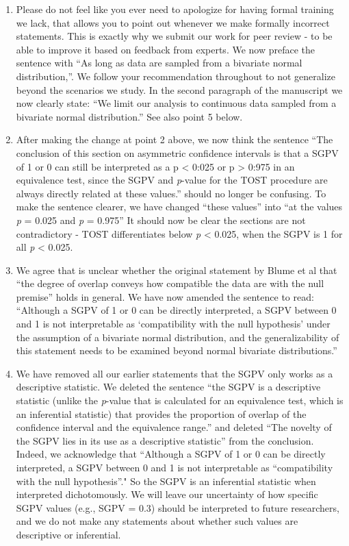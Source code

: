 \documentclass[man]{apa6}
\begin{document}
\begin{enumerate}
\item
  Please do not feel like you ever need to apologize for having formal training we lack, that allows you to point out whenever we make formally incorrect statements. This is exactly why we submit our work for peer review - to be able to improve it based on feedback from experts. We now preface the sentence with \enquote{As long as data are sampled from a bivariate normal distribution,}. We follow your recommendation throughout to not generalize beyond the scenarios we study. In the second paragraph of the manuscript we now clearly state: \enquote{We limit our analysis to continuous data sampled from a bivariate normal distribution.} See also point 5 below.
\item
  After making the change at point 2 above, we now think the sentence \enquote{The conclusion of this section on asymmetric confidence intervals is that a SGPV of 1 or 0 can still be interpreted as a p \textless{} 0:025 or p \textgreater{} 0:975 in an equivalence test, since the SGPV and \emph{p}-value for the TOST procedure are always directly related at these values.} should no longer be confusing. To make the sentence clearer, we have changed \enquote{these values} into \enquote{at the values \emph{p} = 0.025 and \emph{p} = 0.975} It should now be clear the sections are not contradictory - TOST differentiates below \emph{p} \textless{} 0.025, when the SGPV is 1 for all \emph{p} \textless{} 0.025.
\item
  We agree that is unclear whether the original statement by Blume et al that \enquote{the degree of overlap conveys how compatible the data are with the null premise} holds in general. We have now amended the sentence to read: \enquote{Although a SGPV of 1 or 0 can be directly interpreted, a SGPV between 0 and 1 is not interpretable as \enquote{compatibility with the null hypothesis} under the assumption of a bivariate normal distribution, and the generalizability of this statement needs to be examined beyond normal bivariate distributions.}
\item
  We have removed all our earlier statements that the SGPV only works as a descriptive statistic. We deleted the sentence \enquote{the SGPV is a descriptive statistic (unlike the \emph{p}-value that is calculated for an equivalence test, which is an inferential statistic) that provides the proportion of overlap of the confidence interval and the equivalence range.} and deleted \enquote{The novelty of the SGPV lies in its use as a descriptive statistic} from the conclusion. Indeed, we acknowledge that \enquote{Although a SGPV of 1 or 0 can be directly interpreted, a SGPV between 0 and 1 is not interpretable as ``compatibility with the null hypothesis}." So the SGPV is an inferential statistic when interpreted dichotomously. We will leave our uncertainty of how specific SGPV values (e.g., SGPV = 0.3) should be interpreted to future researchers, and we do not make any statements about whether such values are descriptive or inferential.
\end{enumerate}
\end{document}
